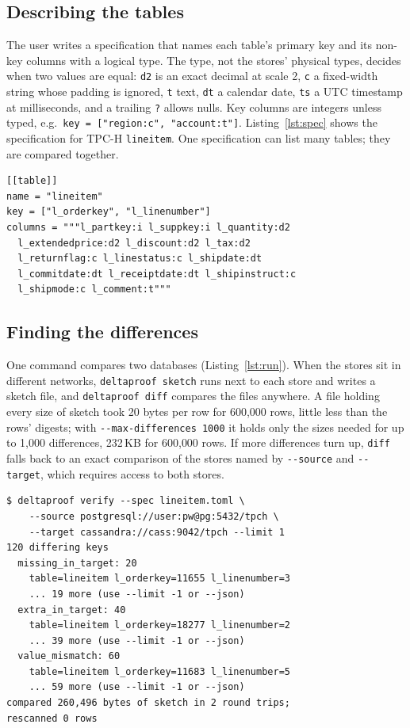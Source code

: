 \documentclass[conference]{IEEEtran}
\begin{document}
\subsection{Describing the tables}
The user writes a specification that names each table's primary key and its non-key columns with a logical type. The type, not the stores' physical types, decides when two values are equal: \texttt{d2} is an exact decimal at scale 2, \texttt{c} a fixed-width string whose padding is ignored, \texttt{t} text, \texttt{dt} a calendar date, \texttt{ts} a UTC timestamp at milliseconds, and a trailing \texttt{?} allows nulls. Key columns are integers unless typed, e.g.\ \texttt{key = ["region:c", "account:t"]}. Listing~\ref{lst:spec} shows the specification for TPC-H \texttt{lineitem}. One specification can list many tables; they are compared together.

\begin{lstlisting}[caption={Table specification (\texttt{lineitem.toml})}, label={lst:spec}]
[[table]]
name = "lineitem"
key = ["l_orderkey", "l_linenumber"]
columns = """l_partkey:i l_suppkey:i l_quantity:d2
  l_extendedprice:d2 l_discount:d2 l_tax:d2
  l_returnflag:c l_linestatus:c l_shipdate:dt
  l_commitdate:dt l_receiptdate:dt l_shipinstruct:c
  l_shipmode:c l_comment:t"""
\end{lstlisting}

\subsection{Finding the differences}
One command compares two databases (Listing~\ref{lst:run}). When the stores sit in different networks, \texttt{deltaproof sketch} runs next to each store and writes a sketch file, and \texttt{deltaproof diff} compares the files anywhere. A file holding every size of sketch took 20 bytes per row for 600{,}000 rows, little less than the rows' digests; with \texttt{-{}-max-differences 1000} it holds only the sizes needed for up to 1{,}000 differences, 232\,KB for 600{,}000 rows. If more differences turn up, \texttt{diff} falls back to an exact comparison of the stores named by \texttt{-{}-source} and \texttt{-{}-target}, which requires access to both stores.

\begin{lstlisting}[caption={Comparing PostgreSQL with Cassandra (\texttt{-{}-limit 1})}, label={lst:run}]
$ deltaproof verify --spec lineitem.toml \
    --source postgresql://user:pw@pg:5432/tpch \
    --target cassandra://cass:9042/tpch --limit 1
120 differing keys
  missing_in_target: 20
    table=lineitem l_orderkey=11655 l_linenumber=3
    ... 19 more (use --limit -1 or --json)
  extra_in_target: 40
    table=lineitem l_orderkey=18277 l_linenumber=2
    ... 39 more (use --limit -1 or --json)
  value_mismatch: 60
    table=lineitem l_orderkey=11683 l_linenumber=5
    ... 59 more (use --limit -1 or --json)
compared 260,496 bytes of sketch in 2 round trips;
rescanned 0 rows
\end{lstlisting}
\end{document}
